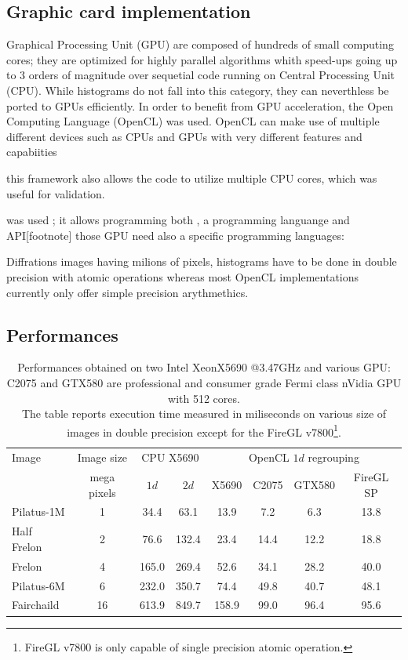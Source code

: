 \documentclass[a4paper]{jpconf}
\begin{document}
\subsection{Graphic card implementation}
Graphical Processing Unit (GPU) are composed of hundreds of
small computing cores; they are optimized for highly parallel  algorithms 
whith speed-ups going up to 3 orders of magnitude over sequetial  code running
on Central Processing Unit (CPU).
While histograms do not fall into this category, they can  neverthless be ported
to GPUs efficiently. In order to benefit from GPU acceleration, the Open
Computing Language (OpenCL) was used. OpenCL can make use of multiple  different
devices such as CPUs and GPUs with very different features and capabiities

this
framework also allows the code to utilize multiple CPU cores, which was
useful for validation.


was used ; it allows programming both , a programming languange and
API[footnote] those GPU need also a specific programming languages:

Diffrations images having milions of pixels,
histograms have to be done in double precision with atomic operations whereas
most OpenCL implementations currently only offer simple precision arythmethics.


\subsection{Performances}
\begin{table}[h]
\caption{\label{blobs}Performances obtained on two Intel XeonX5690 @3.47GHz and various GPU: C2075 and GTX580 are professional and consumer grade Fermi class nVidia GPU with 512 cores.\\
 The table reports execution time measured in miliseconds on various size of images in double precision except for the FireGL v7800\footnote{FireGL v7800 is only capable of single precision atomic operation.}.}
\begin{center}
\begin{tabular}{|l|c||c|c||c|c|c|c|}
\hline
Image               & Image size 	& \multicolumn{2}{|c||}{CPU X5690}& \multicolumn{4}{|c|}{OpenCL $1d$ regrouping} \\
					& mega pixels	& $1d$	&	$2d$	&	X5690	&	C2075	&	GTX580	&	FireGL SP\\
\hline
Pilatus-1M 			&1 	 			& 34.4  &	63.1	&	13.9	&	7.2		&	6.3		&	13.8 \\
Half Frelon 		&2 	 			& 76.6  &   132.4   &	23.4	&	14.4	&	12.2	&	18.8 \\
Frelon 				& 4  			& 165.0	&	269.4   &	52.6	&	34.1	&	28.2	&	40.0 \\
Pilatus-6M 			& 6  			& 232.0	&	350.7	&	74.4	&	49.8	&	40.7	&	48.1 \\
Fairchaild 			& 16 			& 613.9	&	849.7   &	158.9	&	99.0	&	96.4	&	95.6 \\
\hline
\end{tabular}
\end{center}
\end{table}
\end{document}
